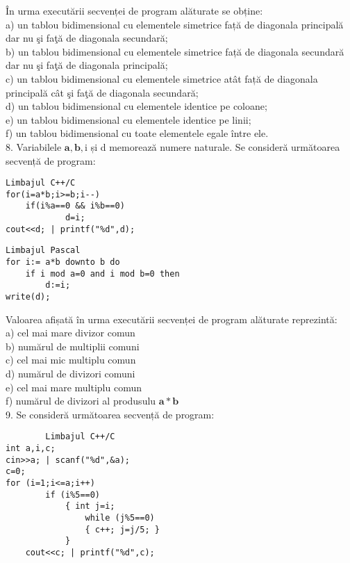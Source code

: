 În urma executării secvenței de program alăturate se obține:\\
a) un tablou bidimensional cu elementele simetrice față de diagonala principală dar nu şi faţă de diagonala secundară;\\
b) un tablou bidimensional cu elementele simetrice față de diagonala secundară dar nu şi faţă de diagonala principală;\\
c) un tablou bidimensional cu elementele simetrice atât față de diagonala principală cât şi faţă de diagonala secundară;\\
d) un tablou bidimensional cu elementele identice pe coloane;\\
e) un tablou bidimensional cu elementele identice pe linii;\\
f) un tablou bidimensional cu toate elementele egale între ele.\\
8. Variabilele $\mathbf{a}, \mathbf{b}, \mathrm{i}$ și d memorează numere naturale. Se consideră următoarea secvență de program:

\begin{verbatim}
Limbajul C++/C
for(i=a*b;i>=b;i--)
    if(i%a==0 && i%b==0)
            d=i;
cout<<d; | printf("%d",d);
\end{verbatim}

\begin{verbatim}
Limbajul Pascal
for i:= a*b downto b do
    if i mod a=0 and i mod b=0 then
        d:=i;
write(d);
\end{verbatim}

Valoarea afișată în urma executării secvenței de program alăturate reprezintă:\\
a) cel mai mare divizor comun\\
b) numărul de multiplii comuni\\
c) cel mai mic multiplu comun\\
d) numărul de divizori comuni\\
e) cel mai mare multiplu comun\\
f) numărul de divizori al produsulu $\mathbf{a * b}$\\
9. Se consideră următoarea secvență de program:

\begin{verbatim}
        Limbajul C++/C
int a,i,c;
cin>>a; | scanf("%d",&a);
c=0;
for (i=1;i<=a;i++)
        if (i%5==0)
            { int j=i;
                while (j%5==0)
                { c++; j=j/5; }
            }
    cout<<c; | printf("%d",c);
\end{verbatim}

